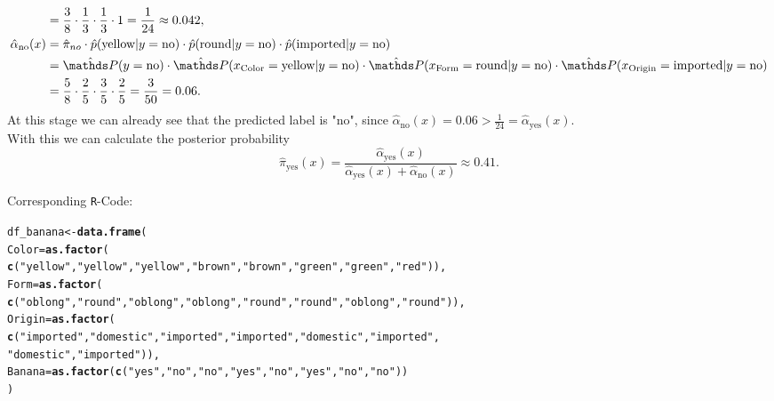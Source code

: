 \documentclass[a4paper]{article}
\makeatletter
\newcommand{\hlstr}[1]{\textcolor[rgb]{0.192,0.494,0.8}{#1}}%
\newcommand{\hlstd}[1]{\textcolor[rgb]{0.345,0.345,0.345}{#1}}%
\newcommand{\hlkwb}[1]{\textcolor[rgb]{0.69,0.353,0.396}{#1}}%
\newcommand{\hlkwc}[1]{\textcolor[rgb]{0.333,0.667,0.333}{#1}}%
\newcommand{\hlkwd}[1]{\textcolor[rgb]{0.737,0.353,0.396}{\textbf{#1}}}%
\newenvironment{kframe}{%
 \def\at@end@of@kframe{}%
 \ifinner\ifhmode%
  \def\at@end@of@kframe{\end{minipage}}%
  \begin{minipage}{\columnwidth}%
 \fi\fi%
 \def\FrameCommand##1{\hskip\@totalleftmargin \hskip-\fboxsep
 \colorbox{shadecolor}{##1}\hskip-\fboxsep
     \hskip-\linewidth \hskip-\@totalleftmargin \hskip\columnwidth}%
 \MakeFramed {\advance\hsize-\width
   \@totalleftmargin\z@ \linewidth\hsize
   \@setminipage}}%
 {\par\unskip\endMakeFramed%
 \at@end@of@kframe}
\newenvironment{knitrout}{}{} %
\makeatother
\begin{document}
{\begin{enumerate}
\begin{align*}
= & \; \frac{3}{8} \cdot \frac{1}{3} \cdot \frac{1}{3} \cdot 1 = \frac{1}{24} \approx 0.042, \\
\hat{\alpha}_\text{no}(x) = & \;  \hat{\pi}_{no} \cdot \hat{p}(\text{yellow}|y = \text{no})\cdot \hat{p}(\text{round}|y = \text{no}) \cdot \hat{p}(\text{imported}|y = \text{no}) \\
= & \; \hat{\P}(y = \text{no}) \cdot \hat{\P}(x_\text{Color} = \text{yellow}|y = \text{no})\cdot \hat{\P}(x_\text{Form}=\text{round}|y = \text{no}) \cdot \hat{\P}(x_\text{Origin}=\text{imported}|y = \text{no}) \\
= & \; \frac{5}{8} \cdot \frac{2}{5} \cdot \frac{3}{5} \cdot \frac{2}{5} = \frac{3}{50} = 0.06.
\end{align*}
At this stage we can already see that the predicted label is "no", since $ \hat{\alpha}_\text{no}(x) = 0.06>\frac{1}{24} = 
\hat{\alpha}_\text{yes}(x)$. \\
With this we can calculate the posterior probability
$$\hat{\pi}_\text{yes}(x) = \frac{\hat{\alpha}_\text{yes}(x)}{\hat{\alpha}_\text{yes}(x) + \hat{\alpha}_\text{no}(x)} \approx 0.41.$$


    Corresponding \texttt{R}-Code:

\begin{knitrout}
\color{fgcolor}\begin{kframe}
\begin{alltt}
\hlstd{df_banana} \hlkwb{<-} \hlkwd{data.frame}\hlstd{(}
  \hlkwc{Color} \hlstd{=} \hlkwd{as.factor}\hlstd{(}
    \hlkwd{c}\hlstd{(}\hlstr{"yellow"}\hlstd{,} \hlstr{"yellow"}\hlstd{,} \hlstr{"yellow"}\hlstd{,} \hlstr{"brown"}\hlstd{,} \hlstr{"brown"}\hlstd{,} \hlstr{"green"}\hlstd{,} \hlstr{"green"}\hlstd{,} \hlstr{"red"}\hlstd{)),}
  \hlkwc{Form} \hlstd{=} \hlkwd{as.factor}\hlstd{(}
    \hlkwd{c}\hlstd{(}\hlstr{"oblong"}\hlstd{,} \hlstr{"round"}\hlstd{,} \hlstr{"oblong"}\hlstd{,} \hlstr{"oblong"}\hlstd{,} \hlstr{"round"}\hlstd{,} \hlstr{"round"}\hlstd{,} \hlstr{"oblong"}\hlstd{,} \hlstr{"round"}\hlstd{)),}
  \hlkwc{Origin} \hlstd{=} \hlkwd{as.factor}\hlstd{(}
    \hlkwd{c}\hlstd{(}\hlstr{"imported"}\hlstd{,} \hlstr{"domestic"}\hlstd{,} \hlstr{"imported"}\hlstd{,} \hlstr{"imported"}\hlstd{,} \hlstr{"domestic"}\hlstd{,} \hlstr{"imported"}\hlstd{,}
    \hlstr{"domestic"}\hlstd{,} \hlstr{"imported"}\hlstd{)),}
  \hlkwc{Banana} \hlstd{=} \hlkwd{as.factor}\hlstd{(}\hlkwd{c}\hlstd{(}\hlstr{"yes"}\hlstd{,} \hlstr{"no"}\hlstd{,} \hlstr{"no"}\hlstd{,} \hlstr{"yes"}\hlstd{,} \hlstr{"no"}\hlstd{,} \hlstr{"yes"}\hlstd{,} \hlstr{"no"}\hlstd{,} \hlstr{"no"}\hlstd{))}
\hlstd{)}


\end{alltt}
\end{kframe}
\end{knitrout}
\end{enumerate}}
\end{document}
